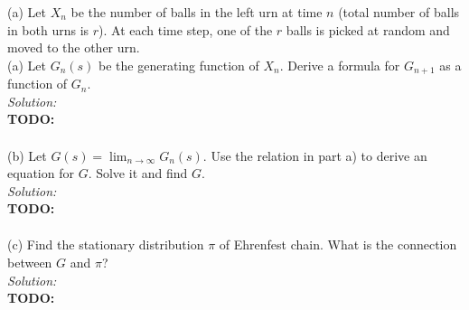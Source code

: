 \documentclass[10pt]{amsart}
\begin{document}
\newpage


 (a) Let $X_n$ be the number of balls in the left urn at time $n$ (total number of balls in both urns is $r$). At each time step, one of the $r$ balls is picked at random and moved to the other urn. \\

\noindent
(a) Let $G_n(s)$ be the generating function of $X_n$. Derive a formula for $G_{n+1}$ as a function of $G_n$. \\

\noindent
\textit{Solution:} \\
\textbf{TODO:} \\
\begin{align*}
\end{align*}

\noindent
(b) Let $G(s)= \lim_{n \to \infty}  G_n(s)$. Use the relation in part a) to derive an equation for $G$. Solve it and find $G$. \\

\noindent
\textit{Solution:} \\
\textbf{TODO:} \\
\begin{align*}
\end{align*}

\noindent
(c) Find the stationary distribution $\pi$ of Ehrenfest chain. What is the connection between $G$ and $\pi$? \\

\noindent
\textit{Solution:} \\
\textbf{TODO:} \\
\begin{align*}
\end{align*}

\newpage
\end{document}
